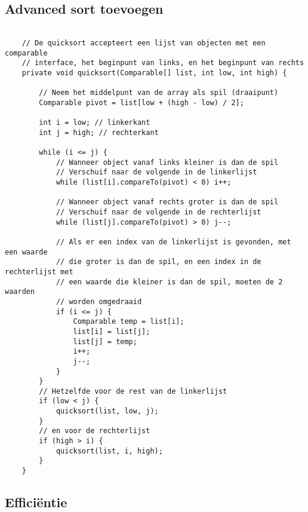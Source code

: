 \documentclass[12pt,notitlepage]{article}
\begin{document}
\subsection{Advanced sort toevoegen}

\begin{lstlisting}

    // De quicksort accepteert een lijst van objecten met een comparable
    // interface, het beginpunt van links, en het beginpunt van rechts
    private void quicksort(Comparable[] list, int low, int high) {

        // Neem het middelpunt van de array als spil (draaipunt)
        Comparable pivot = list[low + (high - low) / 2];

        int i = low; // linkerkant
        int j = high; // rechterkant

        while (i <= j) {
            // Wanneer object vanaf links kleiner is dan de spil
            // Verschuif naar de volgende in de linkerlijst
            while (list[i].compareTo(pivot) < 0) i++;

            // Wanneer object vanaf rechts groter is dan de spil
            // Verschuif naar de volgende in de rechterlijst
            while (list[j].compareTo(pivot) > 0) j--;

            // Als er een index van de linkerlijst is gevonden, met een waarde
            // die groter is dan de spil, en een index in de rechterlijst met
            // een waarde die kleiner is dan de spil, moeten de 2 waarden
            // worden omgedraaid
            if (i <= j) {
                Comparable temp = list[i];
                list[i] = list[j];
                list[j] = temp;
                i++;
                j--;
            }
        }
        // Hetzelfde voor de rest van de linkerlijst
        if (low < j) {
            quicksort(list, low, j);
        }
        // en voor de rechterlijst
        if (high > i) {
            quicksort(list, i, high);
        }
    }
\end{lstlisting}

\subsection{Efficiëntie}


\end{document}
